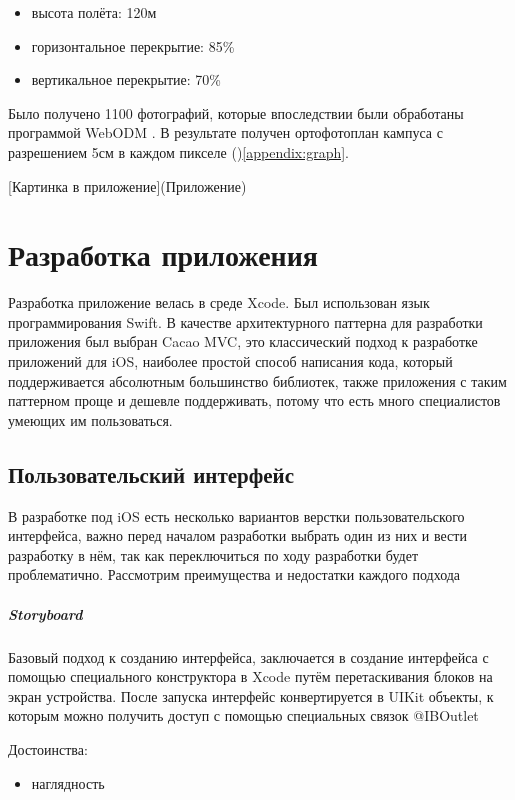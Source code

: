       \begin{itemize}
        \item высота полёта: 120м
        \item горизонтальное перекрытие: 85\%
        \item вертикальное перекрытие: 70\%
      \end{itemize}

      Было получено 1100 фотографий, которые впоследствии были обработаны программой WebODM \cite{WebODM}. В результате получен ортофотоплан кампуса с разрешением 5см в каждом пикселе ()\ref{appendix:graph}.

      [Картинка в приложение](Приложение)

\chapter{Разработка приложения}
  Разработка приложение велась в среде Xcode. Был использован язык программирования Swift. В качестве архитектурного паттерна для разработки приложения был выбран Cacao MVC, это классический подход к разработке приложений для iOS, наиболее простой способ написания кода, который поддерживается абсолютным большинство библиотек, также приложения с таким паттерном проще и дешевле поддерживать, потому что есть много специалистов умеющих им пользоваться.

  \section{Пользовательский интерфейс}
    В разработке под iOS есть несколько вариантов верстки пользовательского интерфейса, важно перед началом разработки выбрать один из них и вести разработку в нём, так как переключиться по ходу разработки будет проблематично. Рассмотрим преимущества и недостатки каждого подхода

    \paragraph{Storyboard}
      Базовый подход к созданию интерфейса, заключается в создание интерфейса с помощью специального конструктора в Xcode путём перетаскивания блоков на экран устройства. После запуска интерфейс конвертируется в UIKit объекты, к которым можно получить доступ с помощью специальных связок @IBOutlet

      \noindent Достоинства:
      \begin{itemize}
        \item наглядность
      \end{itemize}

